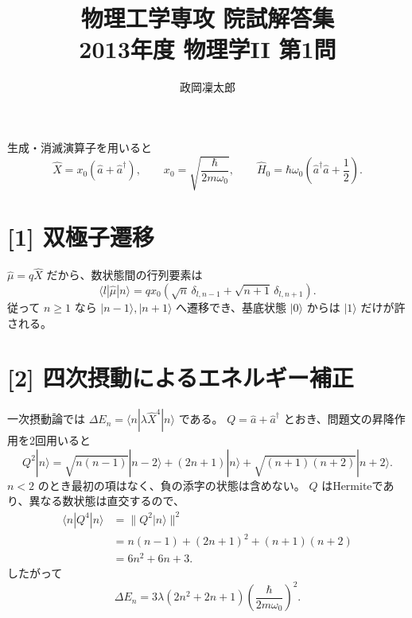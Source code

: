 \documentclass[11pt,a4paper]{article}
\title{物理工学専攻 院試解答集\\2013年度 物理学II 第1問}
\author{政岡凜太郎}
\date{}
\begin{document}
\maketitle

生成・消滅演算子を用いると
\begin{equation}
  \hat X=x_0(\hat a+\hat a^\dagger),\qquad
  x_0=\sqrt{\frac{\hbar}{2m\omega_0}},\qquad
  \hat H_0=\hbar\omega_0\left(\hat a^\dagger\hat a+\frac12\right).
\end{equation}

\section*{[1] 双極子遷移}
$\hat\mu=q\hat X$ だから、数状態間の行列要素は
\begin{equation}
  \langle l|\hat\mu|n\rangle
  =q x_0\left(\sqrt n\,\delta_{l,n-1}
        +\sqrt{n+1}\,\delta_{l,n+1}\right).
\end{equation}
従って $n\ge1$ なら $|n-1\rangle,|n+1\rangle$ へ遷移でき、基底状態 $|0\rangle$ からは $|1\rangle$ だけが許される。

\section*{[2] 四次摂動によるエネルギー補正}
一次摂動論では $\Delta E_n=\langle n|\lambda\hat X^4|n\rangle$ である。
$Q=\hat a+\hat a^\dagger$ とおき、問題文の昇降作用を2回用いると
\begin{equation}
  Q^2|n\rangle=\sqrt{n(n-1)}|n-2\rangle
  +(2n+1)|n\rangle+\sqrt{(n+1)(n+2)}|n+2\rangle.
\end{equation}
$n<2$ のとき最初の項はなく、負の添字の状態は含めない。
$Q$ はHermiteであり、異なる数状態は直交するので、
\begin{align}
  \langle n|Q^4|n\rangle
  &=\|Q^2|n\rangle\|^2\\
  &=n(n-1)+(2n+1)^2+(n+1)(n+2)\\
  &=6n^2+6n+3.
\end{align}
したがって
\begin{equation}
  \boxed{\Delta E_n
  =3\lambda(2n^2+2n+1)\left(\frac{\hbar}{2m\omega_0}\right)^2.}
\end{equation}
\end{document}
